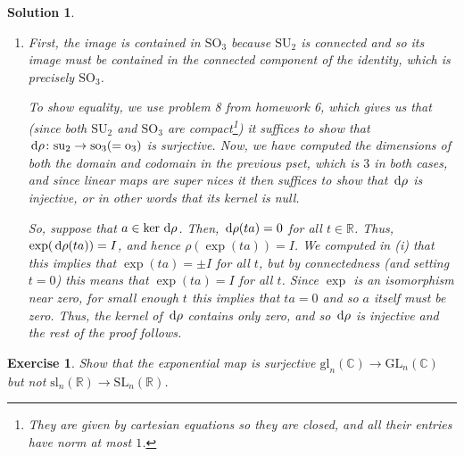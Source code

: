 \documentclass{article}
\newtheorem{ex}{Exercise}
\theoremstyle{nonumberplain}
\newtheorem{sol}{Solution}
\newcommand{\R}{\mathbb{R}}
\newcommand{\C}{\mathbb{C}}
\renewcommand{\lg}[1]{\mathrm{#1}}
\newcommand{\la}[1]{\mathrm{#1}}
\begin{document}
\begin{sol}
\begin{enumerate}
\item First, the image is contained in $\lg{SO}_3$ because $\lg{SU}_2$ is connected and so its image must be contained in the connected component of the identity, which is precisely $\lg{SO}_3$.

To show equality, we use problem 8 from homework 6, which gives us that (since both $\lg{SU}_2$ and $\lg{SO}_3$ are compact\footnote{They are given by cartesian equations so they are closed, and all their entries have norm at most $1$.}) it suffices to show that $\dl \rho \colon \la{su}_2 \to \la{so}_3 ( = \la{o}_3)$ is surjective. Now, we have computed the dimensions of both the domain and codomain in the previous pset, which is $3$ in both cases, and since linear maps are super nices it then suffices to show that $\dl \rho$ is injective, or in other words that its kernel is null.

So, suppose that $a \in \ker \dl \rho$. Then, $\dl \rho(t a) = 0$ for all $t \in \R$. Thus, $\exp(\dl \rho(t a)) = I$, and hence $\rho(\exp(t a)) = I$. We computed in (i) that this implies that $\exp(t a) = \pm I$ for all $t$, but by connectedness (and setting $t = 0$) this means that $\exp(t a) = I$ for all $t$. Since $\exp$ is an isomorphism near zero, for small enough $t$ this implies that $t a = 0$ and so $a$ itself must be zero. Thus, the kernel of $\dl \rho$ contains only zero, and so $\dl \rho$ is injective and the rest of the proof follows.
\end{enumerate}
\end{sol}

\begin{ex}
Show that the exponential map is surjective $\la{gl}_n(\C) \to \lg{GL}_n(\C)$ but not $\la{sl}_n(\R) \to \lg{SL}_n(\R)$.
\end{ex}
\end{document}
